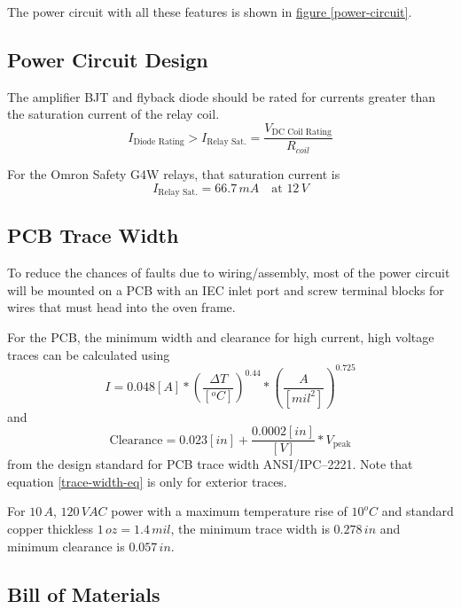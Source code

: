 \documentclass[10pt, twocolumn]{article}
\begin{document}
The power circuit with all these features is shown in
\hyperref[power-circuit]{figure \ref{power-circuit}}.

\subsection{Power Circuit Design}

The amplifier BJT and flyback diode should be rated for currents greater than the saturation
current of the relay coil.
\begin{equation}
I_{\textrm{Diode Rating}}>I_{\textrm{Relay Sat.}}=\frac{V_{\textrm{DC Coil Rating}}}{R_{coil}}
\end{equation}

For the Omron Safety G4W relays, that saturation current is
\begin{equation}
I_{\textrm{Relay Sat.}}=66.7\,mA\quad\textrm{at }12\,V
\end{equation}

\subsection{PCB Trace Width}

To reduce the chances of faults due to wiring/assembly, most of the power
circuit will be mounted on a PCB with an IEC inlet port and screw terminal
blocks for wires that must head into the oven frame.

For the PCB, the minimum width and clearance for high current,
high voltage traces can be calculated using
\begin{equation}
I=0.048[A]*\left(\frac{\Delta T}{[^{o}C]}\right)^{0.44}*\left(\frac{A}{[mil^{2}]}\right)^{0.725}
\label{trace-width-eq}
\end{equation}
and
\begin{equation}
\textrm{Clearance}=0.023[in]+\frac{0.0002[in]}{[V]}*V_{\textrm{peak}}
\end{equation}
from the design standard for PCB trace width ANSI/IPC--2221. Note that
equation \ref{trace-width-eq} is only for exterior traces.

For $10\,A$, $120\,VAC$ power with a maximum temperature rise of $10^{o}C$
and standard copper thickless $1\,oz=1.4\,mil$, the minimum trace width
is $0.278\,in$ and minimum clearance is $0.057\,in$.

\subsection{Bill of Materials}
\end{document}
